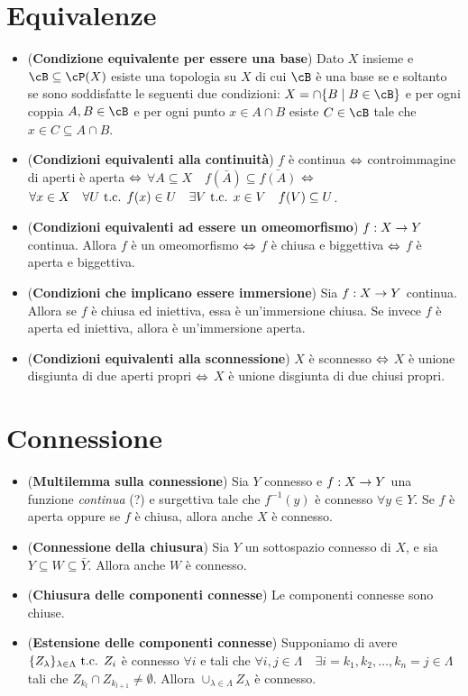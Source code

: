 \documentclass[a4paper,NoNotes,GeneralMath]{stdmdoc}
\begin{document}
	\section*{Equivalenze}
	\begin{itemize}
		\item ({\bf Condizione equivalente per essere una base}) Dato $X$ insieme e $\cB \subseteq \cP (X)$ esiste una topologia su $X$ di cui $\cB$ è una base se e soltanto se sono soddisfatte le seguenti due condizioni: $X = \cap \{B \mid B \in \cB \}$ e per ogni coppia $A,B \in \cB$ e per ogni punto $x \in A \cap B$ esiste $C \in \cB$ tale che $x \in C \subseteq A \cap B$.
		\item ({\bf Condizioni equivalenti alla continuità}) $f$ è continua $\Leftrightarrow$ controimmagine di aperti è aperta $\Leftrightarrow$ $\forall A \subseteq X \quad f(\bar{A}) \subseteq \bar{f(A)}$ $\Leftrightarrow$ $\forall x \in X \quad \forall U \mbox{ t.c. } f(x) \in U \quad \exists V \mbox{ t.c. } x \in V \quad f(V) \subseteq U$.
		\item ({\bf Condizioni equivalenti ad essere un omeomorfismo}) $f: X \rightarrow Y$ continua. Allora $f$ è un omeomorfismo $\Leftrightarrow$ $f$ è chiusa e biggettiva $\Leftrightarrow$ $f$ è aperta e biggettiva.
		\item ({\bf Condizioni che implicano essere immersione}) Sia $f: X \rightarrow Y$ continua. Allora se $f$ è chiusa ed iniettiva, essa è un'immersione chiusa. Se invece $f$ è aperta ed iniettiva, allora è un'immersione aperta.
		\item ({\bf Condizioni equivalenti alla sconnessione}) $X$ è sconnesso $\Leftrightarrow$ $X$ è unione disgiunta di due aperti propri $\Leftrightarrow$ $X$ è unione disgiunta di due chiusi propri.
	\end{itemize}
	
	\section*{Connessione}
	\begin{itemize}
		\item ({\bf Multilemma sulla connessione}) Sia $Y$ connesso e $f: X \rightarrow Y$ una funzione {\it continua} (?) e surgettiva tale che $f^{-1}(y)$ è connesso $\forall y \in Y$. Se $f$ è aperta oppure se $f$ è chiusa, allora anche $X$ è connesso.
		\item ({\bf Connessione della chiusura}) Sia $Y$ un sottospazio connesso di $X$, e sia $Y \subseteq W \subseteq \bar{Y}$. Allora anche $W$ è connesso.
		\item ({\bf Chiusura delle componenti connesse}) Le componenti connesse sono chiuse.
		\item ({\bf Estensione delle componenti connesse}) Supponiamo di avere $\{Z_\lambda\}_{\lambda \in \Lambda} \mbox{ t.c. } Z_i$ è connesso $\forall i$ e tali che $\forall i, j \in \Lambda \quad \exists i=k_1, k_2, \ldots, k_n = j \in \Lambda$ tali che $Z_{k_l} \cap Z_{k_{l+1}} \neq \emptyset$. Allora $\cup_{\lambda \in \Lambda} Z_\lambda$ è connesso.
	\end{itemize}
\end{document}
